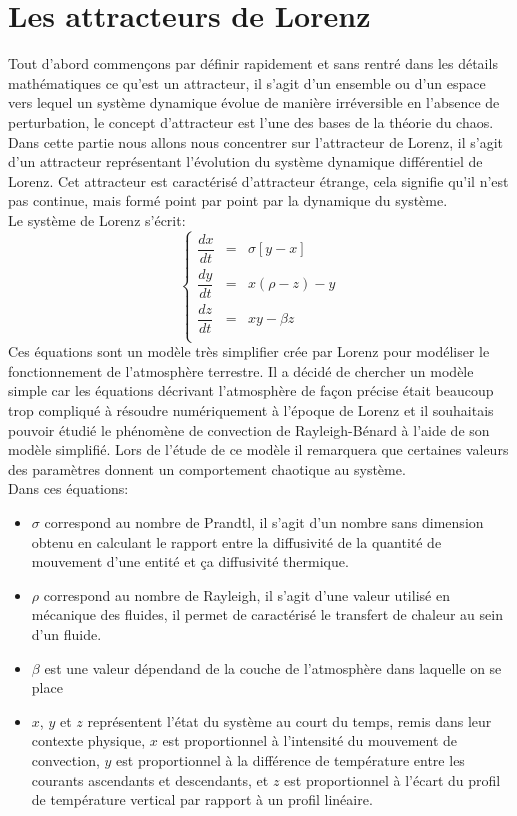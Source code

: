 \chapter{Les attracteurs de Lorenz}
Tout d’abord commençons par définir rapidement et sans rentré dans les détails mathématiques ce qu’est un attracteur,
 il s’agit d’un ensemble ou d’un espace vers lequel un système dynamique évolue de manière
 irréversible en l’absence de perturbation, le concept d’attracteur est l’une des bases de la théorie du chaos. 
 Dans cette partie nous allons nous concentrer sur l’attracteur de Lorenz, il s’agit d’un attracteur
représentant l’évolution du système dynamique différentiel de Lorenz. Cet attracteur est caractérisé d'attracteur étrange, cela signifie qu'il n'est pas continue, mais formé point par point par la dynamique du système.\\

Le système de Lorenz s'écrit: 
\[
    \left\{
    \begin{array}{rcl}
        \dfrac{dx}{dt}&=&\sigma[y-x]\\
        \dfrac{dy}{dt}&=&x(\rho-z)-y\\
        \dfrac{dz}{dt}&=&xy-\beta z\\
    \end{array}
    \right.
\]
Ces équations sont un modèle très simplifier crée par Lorenz pour modéliser le fonctionnement 
de l’atmosphère terrestre. Il a décidé de chercher un modèle simple car 
les équations décrivant l’atmosphère de façon précise était beaucoup trop compliqué à résoudre
 numériquement à l’époque de Lorenz et il souhaitais pouvoir étudié  le phénomène de convection
de Rayleigh-Bénard à l’aide de son modèle simplifié. Lors de l'étude de ce modèle il remarquera que certaines valeurs des paramètres donnent un comportement
chaotique au système.\\


Dans ces équations:
\begin{itemize}
    \item $\sigma$ correspond au nombre de Prandtl, il s'agit d'un nombre sans dimension obtenu en calculant le rapport entre la diffusivité de la quantité de mouvement d'une entité et ça diffusivité thermique.
    \item $\rho$ correspond au nombre de Rayleigh, il s'agit d'une valeur utilisé en mécanique des fluides, il permet de caractérisé le transfert de chaleur au sein d'un fluide.
    \item $\beta $  est une valeur dépendand de la couche de l'atmosphère dans laquelle on se place
    \item $x$, $y$ et $z$ représentent l'état du système au court du temps, remis dans leur contexte physique, $x$ est proportionnel à l'intensité du mouvement de convection, $y$ est proportionnel à la différence de température entre les courants ascendants et descendants, et $z$ est proportionnel à l'écart du profil de température vertical par rapport à un profil linéaire.
\end{itemize}


